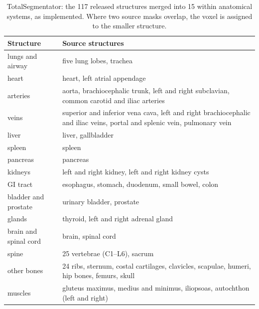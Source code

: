 \begin{table}[H]
\centering
\caption{TotalSegmentator: the 117 released structures merged into 15 within anatomical systems, as implemented. Where two source masks overlap, the voxel is assigned to the smaller structure.}
\label{tab:totalseg}
\small
\begin{tabular}{@{}lp{}@{}}
\toprule
Structure & Source structures \\
\midrule
lungs and airway & five lung lobes, trachea \\
heart & heart, left atrial appendage \\
arteries & aorta, brachiocephalic trunk, left and right subclavian, common carotid and iliac arteries \\
veins & superior and inferior vena cava, left and right brachiocephalic and iliac veins, portal and splenic vein, pulmonary vein \\
liver & liver, gallbladder \\
spleen & spleen \\
pancreas & pancreas \\
kidneys & left and right kidney, left and right kidney cysts \\
GI tract & esophagus, stomach, duodenum, small bowel, colon \\
bladder and prostate & urinary bladder, prostate \\
glands & thyroid, left and right adrenal gland \\
brain and spinal cord & brain, spinal cord \\
spine & 25 vertebrae (C1--L6), sacrum \\
other bones & 24 ribs, sternum, costal cartilages, clavicles, scapulae, humeri, hip bones, femurs, skull \\
muscles & gluteus maximus, medius and minimus, iliopsoas, autochthon (left and right) \\
\bottomrule
\end{tabular}
\end{table}

